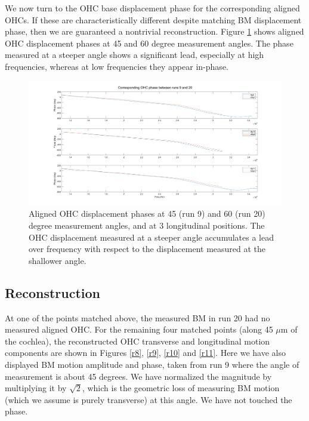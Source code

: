 \documentclass{article}
\begin{document}
\par{We now turn to the OHC base displacement phase for the corresponding aligned OHCs. If these are characteristically different despite matching BM displacement phase, then we are guaranteed a nontrivial reconstruction. Figure \ref{alignedohc} shows aligned OHC displacement phases at 45 and 60 degree measurement angles. The phase measured at a steeper angle shows a significant lead, especially at high frequencies, whereas at low frequencies they appear in-phase.}

\begin{figure}
	\centering
	\includegraphics[width=\textwidth]{"Figures/Aligned OHC9 and OHC20.png"}
	\caption{Aligned OHC displacement phases at 45 (run 9) and 60 (run 20) degree measurement angles, and at 3 longitudinal positions. The OHC displacement measured at a steeper angle accumulates a lead over frequency with respect to the displacement measured at the shallower angle.}
	\label{alignedohc}
\end{figure}

\subsection{Reconstruction}
\par{At one of the points matched above, the measured BM in run 20 had no measured aligned OHC. For the remaining four matched points (along 45 $\mu$m of the cochlea), the reconstructed OHC transverse and longitudinal motion components are shown in Figures \ref{r8}, \ref{r9}, \ref{r10} and \ref{r11}. Here we have also displayed BM motion amplitude and phase, taken from run 9 where the angle of measurement is about 45 degrees. We have normalized the magnitude by multiplying it by $\sqrt{2}$, which is the geometric loss of measuring BM motion (which we assume is purely transverse) at this angle. We have not touched the phase.}
\end{document}
